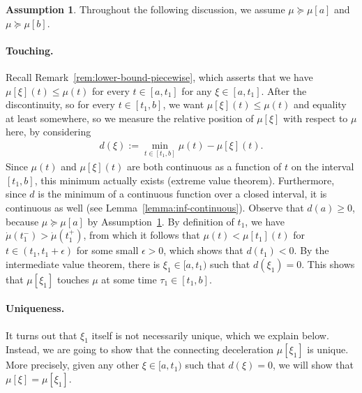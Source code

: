 \documentclass{report}
\theoremstyle{definition}
\newtheorem{assump}{Assumption}[chapter]
\theoremstyle{plain}
\newcommand\halfopen[2]{\ensuremath{[#1,#2)}}
\begin{document}
\begin{assump}\label{assump:smoothing}
  Throughout the following discussion, we assume $\mu \succeq \mu[a]$ and $\mu \succeq \mu[b]$.
\end{assump}



\paragraph{Touching.}
Recall Remark~\ref{rem:lower-bound-piecewise}, which asserts that we have
$\mu[\xi](t) \leq \mu(t)$ for every $t \in [a,t_{1}]$ for any $\xi \in [a, t_{1}]$.
%
After the discontinuity, so for every $t \in [t_{1}, b]$, we want
$\mu[\xi](t) \leq \mu(t)$ and equality at least somewhere, so we measure the relative
position of $\mu[\xi]$ with respect to $\mu$ here, by considering
\begin{align}
  d(\xi) := \min_{t \in [t_{1}, b]} \mu(t) - \mu[\xi](t) .
\end{align}
Since $\mu(t)$ and $\mu[\xi](t)$ are both continuous as a function of $t$ on the interval
$[t_{1}, b]$, this minimum actually exists (extreme value theorem).
%
Furthermore, since $d$ is the minimum of a continuous function over a closed
interval, it is continuous as well (see Lemma~\ref{lemma:inf-continuous}).
%
Observe that $d(a) \geq 0$, because $\mu \succeq \mu[a]$ by Assumption~\ref{assump:smoothing}.
%
By definition of $t_{1}$, we have $\dot{\mu}(t_{1}^{-}) > \dot{\mu}(t_{1}^{+})$,
from which it follows that $\mu(t) < \mu[t_{1}](t)$ for $ t\in (t_{1}, t_{1} + \epsilon)$ for some
small $\epsilon > 0$, which shows that $d(t_{1}) < 0$.
%
By the intermediate value theorem, there is $\xi_{1} \in \halfopen{a}{t_{1}}$ such
that $d(\xi_{1}) = 0$.
%
This shows that $\mu[\xi_{1}]$ touches $\mu$ at some time
$\tau_{1} \in [t_{1}, b]$.


\paragraph{Uniqueness.}
It turns out that $\xi_{1}$ itself is not necessarily unique, which we explain
below. Instead, we are going to show that the connecting deceleration
$\mu[\xi_{1}]$ is unique. More precisely, given any other $\xi \in \halfopen{a}{t_{1}}$ such
that $d(\xi) = 0$, we will show that $\mu[\xi] = \mu[\xi_{1}]$.
\end{document}

